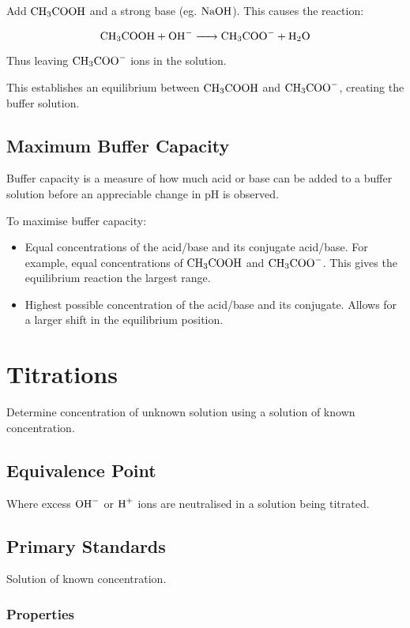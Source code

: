 \documentclass[a4paper,11pt]{article}
\begin{document}
Add $\ce{CH3COOH}$ and a strong base (eg. $\ce{NaOH}$). This causes the
reaction:

$$
\ce{CH3COOH + OH- -> CH3COO- + H2O}
$$

Thus leaving $\ce{CH3COO-}$ ions in the solution.

This establishes an equilibrium between $\ce{CH3COOH}$ and $\ce{CH3COO-}$,
creating the buffer solution.


\subsection{Maximum Buffer Capacity}

Buffer capacity is a measure of how much acid or base can be added to a
buffer solution before an appreciable change in pH is observed.

To maximise buffer capacity:

\begin{itemize}
\item Equal concentrations of the acid/base and its conjugate acid/base. For
	example, equal concentrations of $\ce{CH3COOH}$ and $\ce{CH3COO-}$. This
	gives the equilibrium reaction the largest range.
\item Highest possible concentration of the acid/base and its conjugate. Allows
	for a larger shift in the equilibrium position.
\end{itemize}




\section{Titrations}

Determine concentration of unknown solution using a solution of known
concentration.


\subsection{Equivalence Point}

Where excess $\ce{OH-}$ or $\ce{H+}$ ions are neutralised in a solution being
titrated.


\subsection{Primary Standards}

Solution of known concentration.


\subsubsection{Properties}
\end{document}
